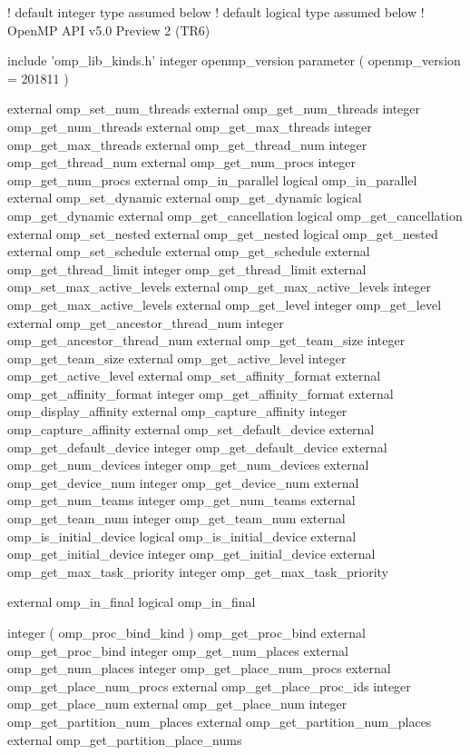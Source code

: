 {\small \begin{ompfSyntax}
! default integer type assumed below
! default logical type assumed below
! OpenMP API v5.0 Preview 2 (TR6)

     include 'omp_lib_kinds.h'
     integer openmp_version
     parameter ( openmp_version = 201811 )

     external omp_set_num_threads
     external omp_get_num_threads
     integer omp_get_num_threads
     external omp_get_max_threads
     integer omp_get_max_threads
     external omp_get_thread_num
     integer omp_get_thread_num
     external omp_get_num_procs
     integer omp_get_num_procs
     external omp_in_parallel
     logical omp_in_parallel
     external omp_set_dynamic
     external omp_get_dynamic
     logical omp_get_dynamic
     external omp_get_cancellation
     logical omp_get_cancellation
     external omp_set_nested
     external omp_get_nested
     logical omp_get_nested
     external omp_set_schedule
     external omp_get_schedule
     external omp_get_thread_limit
     integer omp_get_thread_limit
     external omp_set_max_active_levels
     external omp_get_max_active_levels
     integer omp_get_max_active_levels
     external omp_get_level
     integer omp_get_level
     external omp_get_ancestor_thread_num
     integer omp_get_ancestor_thread_num
     external omp_get_team_size
     integer omp_get_team_size
     external omp_get_active_level
     integer omp_get_active_level
     external omp_set_affinity_format
     external omp_get_affinity_format
     integer omp_get_affinity_format
     external omp_display_affinity
     external omp_capture_affinity
     integer omp_capture_affinity
     external omp_set_default_device
     external omp_get_default_device
     integer omp_get_default_device
     external omp_get_num_devices
     integer omp_get_num_devices
     external omp_get_device_num
     integer omp_get_device_num
     external omp_get_num_teams
     integer omp_get_num_teams
     external omp_get_team_num
     integer omp_get_team_num
     external omp_is_initial_device
     logical omp_is_initial_device
     external omp_get_initial_device
     integer omp_get_initial_device
     external omp_get_max_task_priority
     integer omp_get_max_task_priority

     external omp_in_final
     logical omp_in_final

     integer ( omp_proc_bind_kind ) omp_get_proc_bind
     external omp_get_proc_bind
     integer omp_get_num_places
     external omp_get_num_places
     integer omp_get_place_num_procs
     external omp_get_place_num_procs
     external omp_get_place_proc_ids
     integer omp_get_place_num
     external omp_get_place_num
     integer omp_get_partition_num_places
     external omp_get_partition_num_places
     external omp_get_partition_place_nums


\end{ompfSyntax}}
